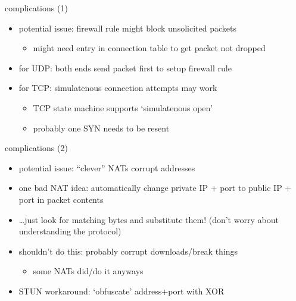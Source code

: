 \begin{frame}{complications (1)}
    \begin{itemize}
    \item potential issue: firewall rule might block unsolicited packets
        \begin{itemize}
        \item might need entry in connection table to get packet not dropped
        \end{itemize}
    \item for UDP: both ends send packet first to setup firewall rule
    \item for TCP: simulatenous connection attempts may work
        \begin{itemize}
        \item TCP state machine supports `simulatenous open'
        \item probably one SYN needs to be resent
        \end{itemize}
    \end{itemize}
\end{frame}

\begin{frame}{complications (2)}
    \begin{itemize}
    \item potential issue: ``clever'' NATs corrupt addresses
    \vspace{.5cm}
    \item one bad NAT idea: automatically change private IP + port to public IP + port in packet contents
    \item \ldots just look for matching bytes and substitute them! (don't worry about understanding the protocol)
    \item shouldn't do this: probably corrupt downloads/break things
        \begin{itemize}
        \item some NATs did/do it anyways
        \end{itemize}
    \vspace{.5cm}
    \item STUN workaround: `obfuscate' address+port with XOR
    \end{itemize}
\end{frame}


